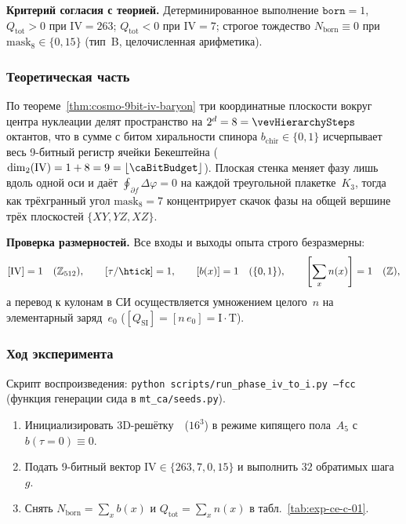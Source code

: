 \textbf{Критерий согласия с теорией.}
Детерминированное выполнение $\texttt{born}=1$, $Q_{\mathrm{tot}} > 0$ при $\mathrm{IV}=263$; $Q_{\mathrm{tot}} < 0$ при $\mathrm{IV}=7$; строгое тождество $N_{\mathrm{born}} \equiv 0$ при $\mathrm{mask}_8 \in \{0, 15\}$ (тип~B, целочисленная арифметика).

\subsubsection*{Теоретическая часть}
По теореме~\ref{thm:cosmo-9bit-iv-baryon} три координатные плоскости вокруг центра нуклеации делят пространство на $2^d = 8 = \vevHierarchySteps$ октантов, что в сумме с битом хиральности спинора $b_{\mathrm{chir}}\in\{0,1\}$ исчерпывает весь 9-битный регистр ячейки Бекештейна ($\dim_2(\mathrm{IV}) = 1 + 8 = 9 = \lfloor\caBitBudget\rfloor$).
Плоская стенка меняет фазу лишь вдоль одной оси и даёт $\oint_{\partial f}\Delta\varphi = 0$ на каждой треугольной плакетке~$K_3$, тогда как трёхгранный угол $\mathrm{mask}_8 = 7$ концентрирует скачок фазы на общей вершине трёх плоскостей $\{XY, YZ, XZ\}$.

\textbf{Проверка размерностей.}
Все входы и выходы опыта строго безразмерны:
\[
  [\mathrm{IV}] = 1\quad(\mathbb{Z}_{512}),\qquad
  [\tau/\htick] = 1,\qquad
  [b(x)] = 1\quad(\{0,1\}),\qquad
  \left[\sum_x n(x)\right] = 1\quad(\mathbb{Z}),
\]
а перевод к кулонам в СИ осуществляется умножением целого~$n$ на элементарный заряд~$e_0$ ($[Q_{\mathrm{SI}}] = [n\,e_0] = \mathrm{I\cdot T}$).

\subsubsection*{Ход эксперимента}
Скрипт воспроизведения: \texttt{python scripts/run\_phase\_iv\_to\_i.py --fcc}
(функция генерации сида в \texttt{mt\_ca/seeds.py}).

\begin{enumerate}[label=\textbf{Шаг \arabic*:},leftmargin=*,itemsep=0.35em]
\item Инициализировать 3D-решётку~\latGCKshort\ ($16^3$) в режиме кипящего пола~$A_5$ с $b(\tau=0)\equiv 0$.
\item Подать 9-битный вектор $\mathrm{IV}\in\{263, 7, 0, 15\}$ и выполнить $32$ обратимых шага~$g$.
\item Снять $N_{\mathrm{born}} = \sum_x b(x)$ и $Q_{\mathrm{tot}} = \sum_x n(x)$ в табл.~\ref{tab:exp-ce-c-01}.
\end{enumerate}

